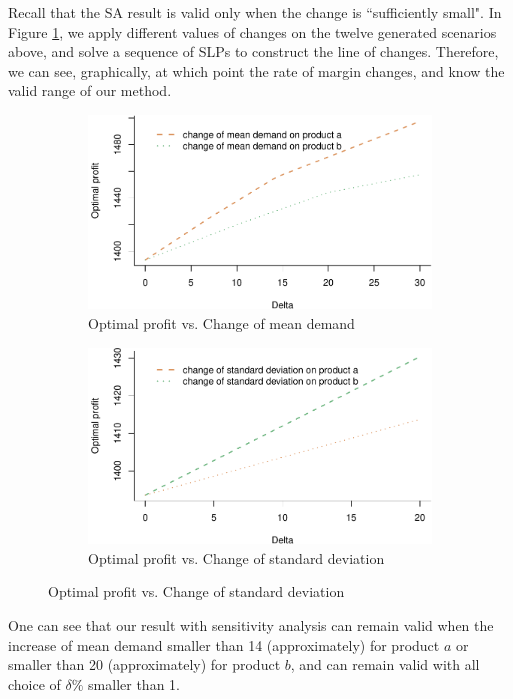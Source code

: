 \documentclass[a4paper,11pt]{article}
\begin{document}
Recall that the SA result is valid only when the change is ``sufficiently small". In Figure \ref{fig:slp}, we
apply different values of changes on the twelve  generated scenarios above, and solve a sequence of SLPs to construct the line of changes. Therefore, we can see, graphically, at which point the rate of margin changes, and know
the valid range of our method. 
\begin{figure}[htb]
\caption{Line of change constructed by solving SLP}
\begin{subfigure}{\textwidth}
\centering
\includegraphics{Example-figure_files/figure-latex/mean-1.pdf}
\caption{Optimal profit vs. Change of mean demand}
\end{subfigure}
\bigskip
\begin{subfigure}{\textwidth}
\centering
\includegraphics{Example-figure_files/figure-latex/var-1.pdf}
\caption{Optimal profit vs. Change of standard deviation}
\end{subfigure}
\label{fig:slp}
\end{figure}

One can see that our result with sensitivity analysis can remain valid when the increase of mean demand smaller than 14 (approximately) for product $a$ or smaller than 20 (approximately) for product $b$, and can remain valid with all choice of $\delta \%$ smaller than 1. 
\end{document}
